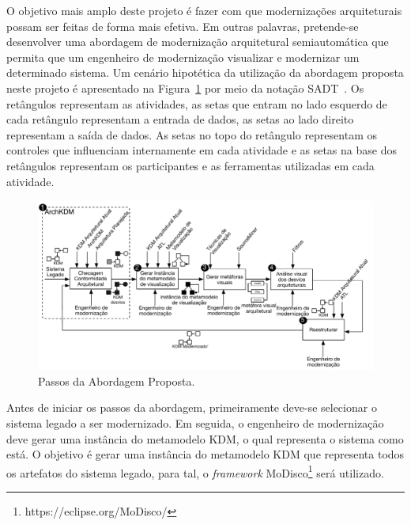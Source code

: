 \documentclass[12pt]{article}
\begin{document}
O objetivo mais amplo deste projeto é fazer com que modernizações arquiteturais possam ser feitas de forma mais efetiva. Em outras palavras, pretende-se desenvolver uma abordagem de modernização arquitetural semiautomática  que permita que um engenheiro de modernização visualizar e modernizar um determinado sistema. %
%
Um cenário hipotética da utilização da abordagem proposta neste projeto é apresentado na Figura~\ref{fig:approach_steps} por meio da notação SADT~\cite{Marcaraf}. Os retângulos representam as atividades, as setas que entram no lado esquerdo de cada retângulo representam a entrada de dados, as setas ao lado direito representam a saída de dados. As setas no topo do retângulo representam os controles que influenciam internamente em cada atividade e as setas na base dos retângulos representam os participantes e as ferramentas utilizadas em cada atividade.

\begin{figure}[htb]
 \label{fig:approach_steps}
 \centering
 \includegraphics[scale=0.6]{projeto_pos_doc_figura6.pdf}
 \caption{Passos da Abordagem Proposta.}
\end{figure}

Antes de iniciar os passos da abordagem, primeiramente deve-se selecionar o sistema legado a ser modernizado. Em seguida, o engenheiro de modernização deve gerar uma instância do metamodelo KDM, o qual representa o sistema como está. O objetivo é gerar uma instância do metamodelo KDM que representa todos os artefatos do sistema legado, para tal, o \textit{framework} MoDisco\footnote{https://eclipse.org/MoDisco/} será utilizado.
\end{document}
